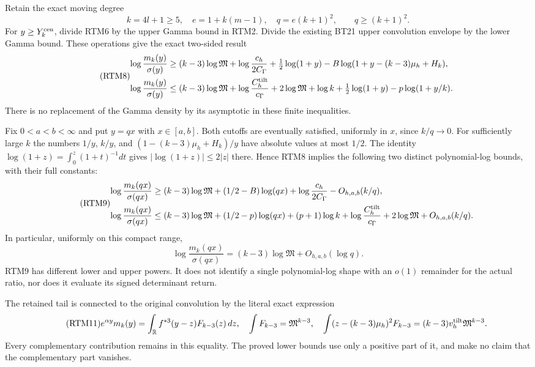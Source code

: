 Retain the exact moving degree
\[
 k=4l+1\ge5,\quad e=1+k(m-1),\quad q=e(k+1)^2,
 \qquad q\ge(k+1)^2.
\]
For $y\ge Y_k^{\rm cen}$, divide RTM6 by the upper Gamma bound in
RTM2.  Divide the existing BT21 upper convolution envelope by the
lower Gamma bound.  These operations give the exact two-sided result
\begin{equation}\tag{RTM8}
 \begin{aligned}
 \log\frac{m_k(y)}{\sigma(y)}\ge{}&(k-3)\log\mathfrak M
 +\log\frac{c_h}{2C_\Gamma}+\tfrac12\log(1+y)
 -B\log(1+y-(k-3)\mu_h+H_k),\\
 \log\frac{m_k(y)}{\sigma(y)}\le{}&(k-3)\log\mathfrak M
 +\log\frac{C_h^{\rm tilt}}{c_\Gamma}+2\log\mathfrak M
 +\log k+\tfrac12\log(1+y)-p\log(1+y/k).
 \end{aligned}
\end{equation}
There is no replacement of the Gamma density by its asymptotic in
these finite inequalities.

Fix $0<a<b<\infty$ and put $y=qx$ with $x\in[a,b]$.
Both cutoffs are eventually satisfied, uniformly in $x$, since
$k/q\to0$.  For sufficiently large $k$ the numbers
$1/y$, $k/y$, and $(1-(k-3)\mu_h+H_k)/y$ have absolute values at
most $1/2$.  The identity
$\log(1+z)=\int_0^z(1+t)^{-1}dt$ gives
$|\log(1+z)|\le2|z|$ there.  Hence RTM8 implies the following
two distinct polynomial-log bounds, with their full constants:
\begin{equation}\tag{RTM9}
 \begin{aligned}
 \log\frac{m_k(qx)}{\sigma(qx)}\ge{}&(k-3)\log\mathfrak M
 +(1/2-B)\log(qx)+\log\frac{c_h}{2C_\Gamma}
 -O_{h,a,b}(k/q),\\
 \log\frac{m_k(qx)}{\sigma(qx)}\le{}&(k-3)\log\mathfrak M
 +(1/2-p)\log(qx)+(p+1)\log k
 +\log\frac{C_h^{\rm tilt}}{c_\Gamma}+2\log\mathfrak M
 +O_{h,a,b}(k/q).
 \end{aligned}
\end{equation}
In particular, uniformly on this compact range,
\begin{equation}\tag{RTM10}
 \log\frac{m_k(qx)}{\sigma(qx)}
 =(k-3)\log\mathfrak M+O_{h,a,b}(\log q).
\end{equation}
RTM9 has different lower and upper powers.  It does not identify a
single polynomial-log shape with an $o(1)$ remainder for the actual
ratio, nor does it evaluate its signed determinant return.

The retained tail is connected to the original convolution by the
literal exact expression
\begin{equation}\tag{RTM11}
 e^{\alpha y}m_k(y)=
 \int_{\mathbb R} f^{*3}(y-z)F_{k-3}(z)\,dz,
 \quad
 \int F_{k-3}=\mathfrak M^{k-3},\quad
 \int(z-(k-3)\mu_h)^2F_{k-3}
 =(k-3)v_h^{\rm tilt}\mathfrak M^{k-3}.
\end{equation}
Every complementary contribution remains in this equality.  The
proved lower bounds use only a positive part of it, and make no
claim that the complementary part vanishes.

